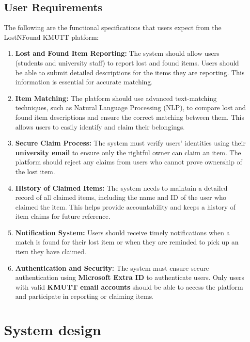 \subsection{User Requirements}
\par
The following are the functional specifications that users expect from the LostNFound KMUTT platform:
\begin{enumerate}
    \item \textbf{Lost and Found Item Reporting:} The system should allow users (students and university staff) to report lost and found items. Users should be able to submit detailed descriptions for the items they are reporting. This information is essential for accurate matching.
    \item \textbf{Item Matching:} The platform should use advanced text-matching techniques, such as Natural Language Processing (NLP), to compare lost and found item descriptions and ensure the correct matching between them. This allows users to easily identify and claim their belongings.
    \item \textbf{Secure Claim Process:} The system must verify users' identities using their \textbf{university email} to ensure only the rightful owner can claim an item. The platform should reject any claims from users who cannot prove ownership of the lost item.
    \item \textbf{History of Claimed Items:} The system needs to maintain a detailed record of all claimed items, including the name and ID of the user who claimed the item. This helps provide accountability and keeps a history of item claims for future reference.
    \item \textbf{Notification System:} Users should receive timely notifications when a match is found for their lost item or when they are reminded to pick up an item they have claimed.
    \item \textbf{Authentication and Security:} The system must ensure secure authentication using \textbf{Microsoft Extra ID} to authenticate users. Only users with valid \textbf{KMUTT email accounts} should be able to access the platform and participate in reporting or claiming items.
\end{enumerate}

\section{System design}
